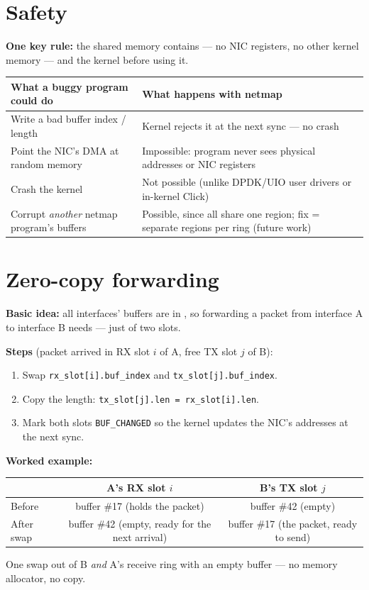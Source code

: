 \section{Safety}
\textbf{One key rule:} the shared memory contains  --- no NIC registers, no other kernel memory --- and the kernel  before using it.
\begin{center}
\small
\begin{tabularx}{\linewidth}{@{}l X@{}}
\toprule
\textbf{What a buggy program could do} & \textbf{What happens with netmap} \\
\midrule
Write a bad buffer index / length & Kernel rejects it at the next sync --- no crash \\
Point the NIC's DMA at random memory & Impossible: program never sees physical addresses or NIC registers \\
Crash the kernel & Not possible (unlike DPDK/UIO user drivers or in-kernel Click) \\
Corrupt \emph{another} netmap program's buffers & Possible, since all share one region; fix = separate regions per ring (future work) \\
\bottomrule
\end{tabularx}
\end{center}

\section{Zero-copy forwarding}
\textbf{Basic idea:} all interfaces' buffers are in , so forwarding a packet from interface A to interface B needs  --- just  of two slots.

\textbf{Steps} (packet arrived in RX slot $i$ of A, free TX slot $j$ of B):
\begin{enumerate}
\item Swap \texttt{rx\_slot[i].buf\_index} and \texttt{tx\_slot[j].buf\_index}.
\item Copy the length: \texttt{tx\_slot[j].len = rx\_slot[i].len}.
\item Mark both slots \texttt{BUF\_CHANGED} so the kernel updates the NIC's addresses at the next sync.
\end{enumerate}
\textbf{Worked example:}
\begin{center}
\begin{tabular}{@{}lcc@{}}
\toprule
 & \textbf{A's RX slot $i$} & \textbf{B's TX slot $j$} \\
\midrule
Before & buffer \#17 (holds the packet) & buffer \#42 (empty) \\
After swap & buffer \#42 (empty, ready for the next arrival) & buffer \#17 (the packet, ready to send) \\
\bottomrule
\end{tabular}
\end{center}
One swap  out of B \emph{and}  A's receive ring with an empty buffer --- no memory allocator, no copy.

